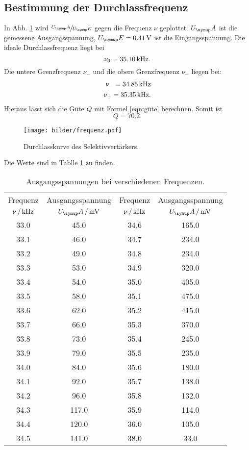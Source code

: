 \subsection{Bestimmung der Durchlassfrequenz}
In Abb. \ref{fig:Durchlass} wird $\sfrac{U_\su{A}}{U_\su{E}}$ gegen die Frequenz
$\nu$ geplottet. $U_\su{A}$ ist die gemessene Ausgangsspannung, $U_\su{E} = 0.41\,\si{\volt}$
ist die Eingangsspannung.
Die ideale Durchlassfrequenz liegt bei
\begin{equation}
  \nu_0 = 35.10 \,\si{\kilo\hertz}.
\end{equation}
Die untere Grenzfrequenz $\nu_-$ und die obere Grenzfrequenz $\nu_+$ liegen bei:
\begin{align}
  \nu_- = 34.85 \,\si{\kilo\hertz} \\
  \nu_+ = 35.35 \,\si{\kilo\hertz}.
\end{align}
Hieraus lässt sich die Güte $Q$ mit Formel \eqref{eqn:güte} berechnen. Somit ist
\begin{equation*}
  Q=70.2.
\end{equation*}
\begin{figure}[H]
  \centering
  \texttt{[image: bilder/frequenz.pdf]}
  \caption{Durchlasskurve des Selektivvertärkers.}
  \label{fig:Durchlass}
\end{figure}
\newpage
Die Werte sind in Tablle \ref{tab:werte} zu finden.
\begin{table}
  \centering
  \begin{tabular}{cc|cc}
    \toprule
    \multicolumn{1}{c}{Frequenz} & \multicolumn{1}{c|}{Ausgangsspannung} &
    \multicolumn{1}{c}{Frequenz} & \multicolumn{1}{c}{Ausgangsspannung} \\
    {$\nu\,/\,\si{\kilo\hertz}$} & {$U_\su{A}\,/\mV$}& {$\nu\,/\,\si{\kilo\hertz}$} & {$U_\su{A}\,/\mV$} \\
    \midrule
       33.0 &   45.0 & 34.6  &   165.0 \\
       33.1 &   46.0 & 34.7  &   234.0 \\
       33.2 &   49.0 & 34.8  &   234.0 \\
       33.3 &   53.0 & 34.9  &   320.0 \\
       33.4 &   54.0 & 35.0  &   405.0 \\
       33.5 &   58.0 & 35.1  &   475.0 \\
       33.6 &   62.0 & 35.2  &   415.0 \\
       33.7 &   66.0 & 35.3  &   370.0 \\
       33.8 &   73.0 & 35.4  &   245.0 \\
       33.9 &   79.0 & 35.5  &   235.0 \\
       34.0 &   84.0 & 35.6  &   180.0 \\
       34.1 &   92.0 & 35.7  &   138.0 \\
       34.2 &   96.0 & 35.8  &   132.0 \\
       34.3 &  117.0 & 35.9  &   114.0 \\
       34.4 &  120.0 & 36.0  &   105.0 \\
       34.5 &  141.0 & 38.0  &    33.0 \\
  \bottomrule
  \end{tabular}
  \caption{Ausgangsspannungen bei verschiedenen Frequenzen.}
  \label{tab:werte}
\end{table}
\newpage
